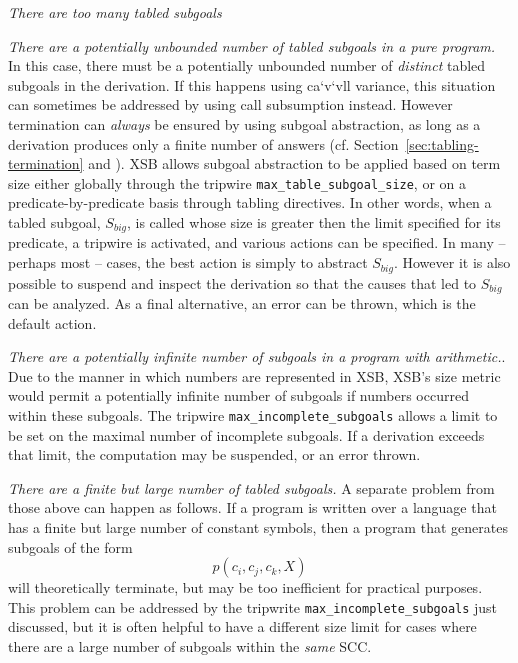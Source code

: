 \bi
\item {\em There are too many tabled subgoals} 
\bi
\item {\em There are a potentially unbounded number of tabled subgoals
 in a pure program.}\/ In this case, there must be a potentially
 unbounded number of {\em distinct} tabled subgoals in the derivation.
  If this happens using ca`v`vll variance, this situation can
 sometimes be addressed by using call subsumption instead.  However
 termination can {\em always} be ensured by using subgoal abstraction,
 as long as a derivation produces only a finite number of answers
 (cf. Section~\ref{sec:tabling-termination} and \cite{RigS14}).  XSB
 allows subgoal abstraction to be applied based on term size either
 globally through the tripwire {\tt max\_table\_subgoal\_size}, or on
 a predicate-by-predicate basis through tabling directives.  In other
 words, when a tabled subgoal, $S_{big}$, is called whose size is
 greater then the limit specified for its predicate, a tripwire is
 activated, and various actions can be specified.  In many -- perhaps
 most -- cases, the best action is simply to abstract $S_{big}$.
  However it is also possible to suspend and inspect the derivation so
 that the causes that led to $S_{big}$ can be analyzed.  As a final
 alternative, an error can be thrown, which is the default action.

\item {\em There are a potentially infinite number of subgoals in a
 program with arithmetic.}.  Due to the manner in which numbers are
 represented in XSB, XSB's size metric would permit a potentially
 infinite number of subgoals if numbers occurred within these
 subgoals.  The tripwire {\tt max\_incomplete\_subgoals} allows a
 limit to be set on the maximal number of incomplete subgoals.  If a
 derivation exceeds that limit, the computation may be suspended, or
 an error thrown.

\item {\em There are a finite but large number of tabled subgoals.}\/
 A separate problem from those above can happen as follows.  If a
 program is written over a language that has a finite but large number
 of constant symbols, then a program that generates subgoals of the
 form
\[
   p(c_i,c_j,c_k,X)
\]
  will theoretically terminate, but may be too inefficient for
 practical purposes.  This problem can be addressed by the tripwrite
 {\tt max\_incomplete\_subgoals} just discussed, but it is often
 helpful to have a different size limit for cases where there are a
 large number of subgoals within the {\em same} SCC.

